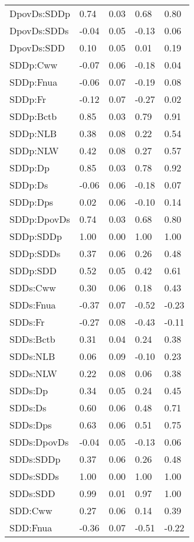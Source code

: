 \begin{center}
\begin{longtable}{|p{0.9in}|p{0.7in}|p{0.7in}|p{0.7in}|p{0.7in}|}
  DpovDs:SDDp & 0.74 & 0.03 & 0.68 & 0.80 \\ 
  DpovDs:SDDs & -0.04 & 0.05 & -0.13 & 0.06 \\ 
  DpovDs:SDD & 0.10 & 0.05 & 0.01 & 0.19 \\ 
  SDDp:Cww & -0.07 & 0.06 & -0.18 & 0.04 \\ 
  SDDp:Fnua & -0.06 & 0.07 & -0.19 & 0.08 \\ 
  SDDp:Fr & -0.12 & 0.07 & -0.27 & 0.02 \\ 
  SDDp:Bctb & 0.85 & 0.03 & 0.79 & 0.91 \\ 
  SDDp:NLB & 0.38 & 0.08 & 0.22 & 0.54 \\ 
  SDDp:NLW & 0.42 & 0.08 & 0.27 & 0.57 \\ 
  SDDp:Dp & 0.85 & 0.03 & 0.78 & 0.92 \\ 
  SDDp:Ds & -0.06 & 0.06 & -0.18 & 0.07 \\ 
  SDDp:Dps & 0.02 & 0.06 & -0.10 & 0.14 \\ 
  SDDp:DpovDs & 0.74 & 0.03 & 0.68 & 0.80 \\ 
  SDDp:SDDp & 1.00 & 0.00 & 1.00 & 1.00 \\ 
  SDDp:SDDs & 0.37 & 0.06 & 0.26 & 0.48 \\ 
  SDDp:SDD & 0.52 & 0.05 & 0.42 & 0.61 \\ 
  SDDs:Cww & 0.30 & 0.06 & 0.18 & 0.43 \\ 
  SDDs:Fnua & -0.37 & 0.07 & -0.52 & -0.23 \\ 
  SDDs:Fr & -0.27 & 0.08 & -0.43 & -0.11 \\ 
  SDDs:Bctb & 0.31 & 0.04 & 0.24 & 0.38 \\ 
  SDDs:NLB & 0.06 & 0.09 & -0.10 & 0.23 \\ 
  SDDs:NLW & 0.22 & 0.08 & 0.06 & 0.38 \\ 
  SDDs:Dp & 0.34 & 0.05 & 0.24 & 0.45 \\ 
  SDDs:Ds & 0.60 & 0.06 & 0.48 & 0.71 \\ 
  SDDs:Dps & 0.63 & 0.06 & 0.51 & 0.75 \\ 
  SDDs:DpovDs & -0.04 & 0.05 & -0.13 & 0.06 \\ 
  SDDs:SDDp & 0.37 & 0.06 & 0.26 & 0.48 \\ 
  SDDs:SDDs & 1.00 & 0.00 & 1.00 & 1.00 \\ 
  SDDs:SDD & 0.99 & 0.01 & 0.97 & 1.00 \\ 
  SDD:Cww & 0.27 & 0.06 & 0.14 & 0.39 \\ 
  SDD:Fnua & -0.36 & 0.07 & -0.51 & -0.22 \\ 

\end{longtable}
\end{center}
